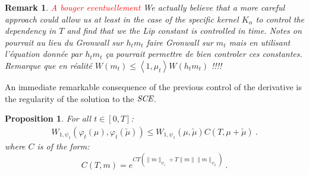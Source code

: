 \documentclass[11pt,a4paper]{article}
\newcommand{\SCE}{\emph{SCE}}
\newcommand{\red}[1]{\textcolor{red}{#1}}
\newcommand{\brac}[1]{\left\langle#1\right\rangle}
\newtheorem{remark}[theorem]{Remark}
\newtheorem{proposition}[theorem]{Proposition}
\begin{document}
\begin{remark}
    \red{A bouger eventuellement} We actually believe that a more careful approach could allow us at least in the case of the specific kernel $K_\alpha$ to control the dependency in $T$ and find that we the Lip constant is controlled in time.
    Notes on pourrait au lieu du Gronwall sur $h_tm_t$ faire Gronwall sur $m_t$ mais en utilisant l'équation donnée par $h_tm_t$ ça pourrait permettre de bien controler ces constantes. Remarque que en réalité $W(m_t) \leq \brac{1,\mu_t} W(h_tm_t)$ !!!!
\end{remark}
An immediate remarkable consequence of the previous control of the derivative is the regularity of the solution to the $\SCE$.
\begin{proposition}
    For all $t \in [0,T]$:
    \begin{align*}
        W_{1,\psi_1} (\varphi_t(\mu),\varphi_t(\tilde{\mu})) \leq W_{1,\psi_1} (\mu,\tilde{\mu}) C(T,\mu +\tilde{\mu}) \ .
    \end{align*}
    where $C$ is of the form:
    \[
        C(T,m) = e^{CT\left(\|m\|_{\psi_1}  +  T\|m\|\|m\|_{\psi_2}\right)}\ .
    \]

\end{proposition}
\end{document}
